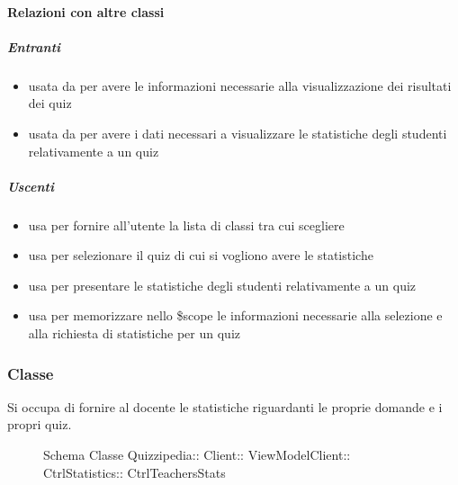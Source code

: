 \paragraph{Relazioni con altre classi}
\subparagraph{Entranti}
\begin{itemize}
\item usata da  per avere le informazioni necessarie alla visualizzazione dei risultati dei quiz
\item usata da  per avere i dati necessari a visualizzare le statistiche degli studenti relativamente a un quiz
\end{itemize}
\subparagraph{Uscenti}
\begin{itemize}
\item usa  per fornire all'utente la lista di classi tra cui scegliere
\item usa  per selezionare il quiz di cui si vogliono avere le statistiche
\item usa  per presentare le statistiche degli studenti relativamente a un quiz
\item usa  per memorizzare nello \$scope le informazioni necessarie alla selezione e alla richiesta di statistiche per un quiz
\end{itemize}
\subsubsection{Classe }
Si occupa di fornire al docente le statistiche riguardanti le proprie domande e i propri quiz.
\begin{figure}[H]
\centering
\noindent{}
\caption[Schema Classe CtrlTeachersStats]{Schema Classe Quizzipedia:: Client:: ViewModelClient:: CtrlStatistics:: CtrlTeachersStats}
\end{figure}
